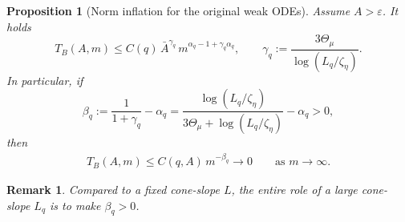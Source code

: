 \documentclass[reqno,11pt]{amsart}
\newtheorem{remark}{Remark}[section]
\newtheorem{proposition}[theorem]{Proposition}
\begin{document}
\begin{proposition}[Norm inflation for the original weak ODEs]
\label{prop:norm_inflation_varcoef}
Assume $A>\varepsilon$.
It holds
\[
T_B(A,m)\le C(q)\,\bar A^{\gamma_q}\,
m^{\alpha_q-1+\gamma_q\alpha_q},
\qquad 
\gamma_q:=\frac{3\Theta_\mu}{\log(L_q/\zeta_\eta)}.
\]
In particular, if
\[
\beta_q:=
\frac{1}{1+\gamma_q}-\alpha_q
=
\frac{\log(L_q/\zeta_\eta)}{3\Theta_\mu+\log(L_q/\zeta_\eta)}-\alpha_q>0,
\]
then
\begin{align}
\label{eq:est_TB}
T_B(A,m)\le C(q,A)\,m^{-\beta_q}\to 0
\qquad\text{as }m\to\infty.
\end{align}
\end{proposition}
\begin{remark}
\label{rem:role_L}
    Compared to a fixed cone-slope $L$, the entire role of a large cone-slope $L_q$  is to make $\beta_q>0$. 
\end{remark}
\end{document}
